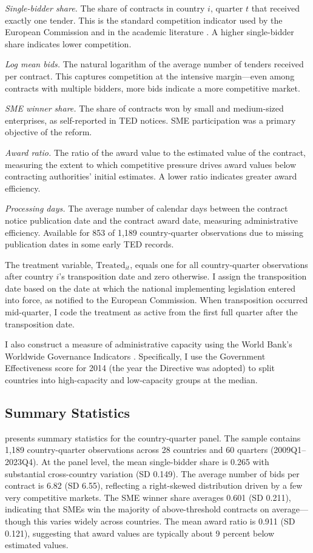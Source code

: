 \documentclass[12pt]{article}
\begin{document}
\textit{Single-bidder share.} The share of contracts in country $i$, quarter $t$ that received exactly one tender. This is the standard competition indicator used by the European Commission and in the academic literature \citep{fazekasKocsis2020, fazekasToth2016}. A higher single-bidder share indicates lower competition.

\textit{Log mean bids.} The natural logarithm of the average number of tenders received per contract. This captures competition at the intensive margin---even among contracts with multiple bidders, more bids indicate a more competitive market.

\textit{SME winner share.} The share of contracts won by small and medium-sized enterprises, as self-reported in TED notices. SME participation was a primary objective of the reform.

\textit{Award ratio.} The ratio of the award value to the estimated value of the contract, measuring the extent to which competitive pressure drives award values below contracting authorities' initial estimates. A lower ratio indicates greater award efficiency.

\textit{Processing days.} The average number of calendar days between the contract notice publication date and the contract award date, measuring administrative efficiency. Available for 853 of 1,189 country-quarter observations due to missing publication dates in some early TED records.

The treatment variable, $\text{Treated}_{it}$, equals one for all country-quarter observations after country $i$'s transposition date and zero otherwise. I assign the transposition date based on the date at which the national implementing legislation entered into force, as notified to the European Commission. When transposition occurred mid-quarter, I code the treatment as active from the first full quarter after the transposition date.

I also construct a measure of administrative capacity using the World Bank's Worldwide Governance Indicators \citep{kaufmann2011}. Specifically, I use the Government Effectiveness score for 2014 (the year the Directive was adopted) to split countries into high-capacity and low-capacity groups at the median.

\subsection{Summary Statistics}

 presents summary statistics for the country-quarter panel. The sample contains 1,189 country-quarter observations across 28 countries and 60 quarters (2009Q1--2023Q4). At the panel level, the mean single-bidder share is 0.265 with substantial cross-country variation (SD 0.149). The average number of bids per contract is 6.82 (SD 6.55), reflecting a right-skewed distribution driven by a few very competitive markets. The SME winner share averages 0.601 (SD 0.211), indicating that SMEs win the majority of above-threshold contracts on average---though this varies widely across countries. The mean award ratio is 0.911 (SD 0.121), suggesting that award values are typically about 9 percent below estimated values.
\end{document}
